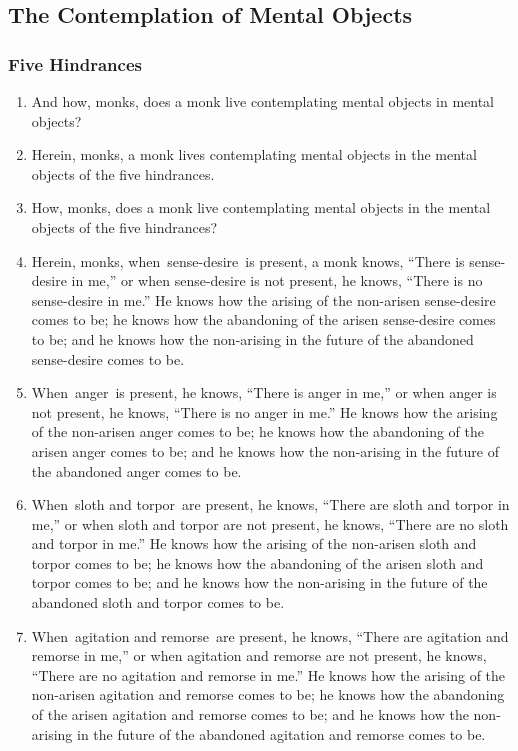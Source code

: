 \documentclass[a4 paper, 12pt]{article}
\begin{document}
\begin{multicols}{2}
\begin{enumerate}[resume]
\end{enumerate}
\subsection*{The Contemplation of Mental Objects}
\subsubsection*{Five Hindrances}
\begin{enumerate}[resume]
\item And how, monks, does a monk live contemplating mental objects in mental objects?
\item Herein, monks, a monk lives contemplating mental objects in the mental objects of the five hindrances.
\item How, monks, does a monk live contemplating mental objects in the mental objects of the five hindrances?
\item Herein, monks, when sense-desire is present, a monk knows, “There is sense-desire in me,” or when sense-desire is not present, he knows, “There is no sense-desire in me.” He knows how the arising of the non-arisen sense-desire comes to be; he knows how the abandoning of the arisen sense-desire comes to be; and he knows how the non-arising in the future of the abandoned sense-desire comes to be.
\item When anger is present, he knows, “There is anger in me,” or when anger is not present, he knows, “There is no anger in me.” He knows how the arising of the non-arisen anger comes to be; he knows how the abandoning of the arisen anger comes to be; and he knows how the non-arising in the future of the abandoned anger comes to be.
\item When sloth and torpor are present, he knows, “There are sloth and torpor in me,” or when sloth and torpor are not present, he knows, “There are no sloth and torpor in me.” He knows how the arising of the non-arisen sloth and torpor comes to be; he knows how the abandoning of the arisen sloth and torpor comes to be; and he knows how the non-arising in the future of the abandoned sloth and torpor comes to be.
\item When agitation and remorse are present, he knows, “There are agitation and remorse in me,” or when agitation and remorse are not present, he knows, “There are no agitation and remorse in me.” He knows how the arising of the non-arisen agitation and remorse comes to be; he knows how the abandoning of the arisen agitation and remorse comes to be; and he knows how the non-arising in the future of the abandoned agitation and remorse comes to be.

\end{enumerate}
\end{multicols}
\end{document}
